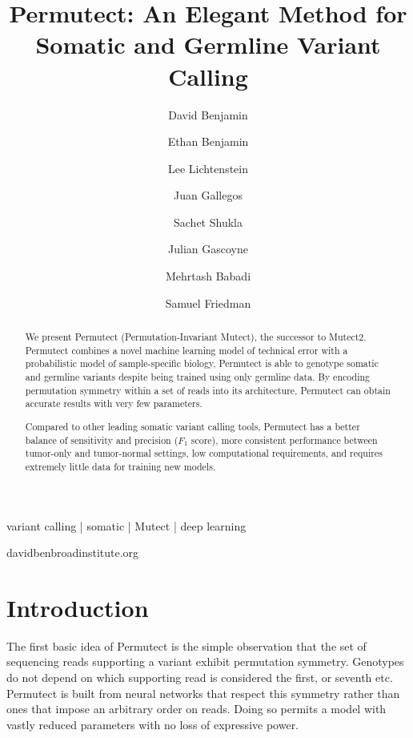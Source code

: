 \documentclass[times, twoside, watermark]{StyleBioRxiv}
\begin{document}
\title{Permutect: An Elegant Method for Somatic and Germline Variant Calling}

\author[1,4\Letter]{David Benjamin}
\author[3]{Ethan Benjamin}
\author[1]{Lee Lichtenstein}
\author[2]{Juan Gallegos}
\author[2]{Sachet Shukla}
\author[2]{Julian Gascoyne}
\author[1]{Mehrtash Babadi}
\author[1]{Samuel Friedman}


\maketitle

\begin{abstract}
We present Permutect (Permutation-Invariant Mutect), the successor to Mutect2.  Permutect combines a novel machine learning model of technical error with a probabilistic model of sample-specific biology, Permutect is able to genotype somatic and germline variants despite being trained using only germline data.  By encoding permutation symmetry within a set of reads into its architecture, Permutect can obtain accurate results with very few parameters.

Compared to other leading somatic variant calling tools, Permutect has a better balance of sensitivity and precision ($F_1$ score), more consistent performance between tumor-only and tumor-normal settings, low computational requirements, and requires extremely little data for training new models.
\end {abstract}

\begin{keywords}
variant calling | somatic | Mutect | deep learning
\end{keywords}

\begin{corrauthor}
davidben\at broadinstitute.org
\end{corrauthor}

\section*{Introduction}
The first basic idea of Permutect is the simple observation that the set of sequencing reads supporting a variant exhibit permutation symmetry. Genotypes do not depend on which supporting read is considered the first, or seventh etc.  Permutect is built from neural networks that respect this symmetry rather than ones that impose an arbitrary order on reads.  Doing so permits a model with vastly reduced parameters with no loss of expressive power.
\end{document}
